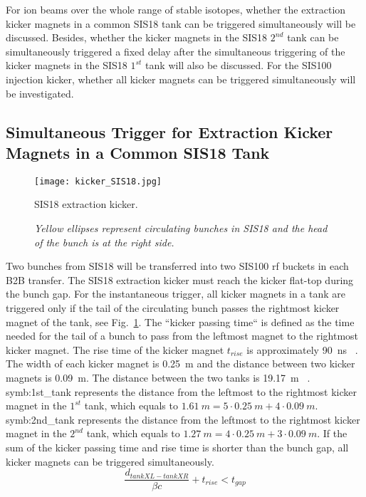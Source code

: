 For ion beams over the whole range of stable isotopes, whether the extraction kicker magnets in a common SIS18 tank can be triggered simultaneously will be discussed. Besides, whether the kicker magnets in the SIS18 $2^{nd}$ tank can be simultaneously triggered a fixed delay after the simultaneous triggering of the kicker magnets in the SIS18 $1^{st}$ tank will also be discussed. For the SIS100 injection kicker, whether all kicker magnets can be triggered simultaneously will be investigated. 


\subsection{Simultaneous Trigger for Extraction Kicker Magnets in a Common SIS18 Tank}
\begin{figure}[H]
   \centering   
   \texttt{[image: kicker\_SIS18.jpg]}
   \caption{SIS18 extraction kicker.}
	\caption*{\textsl{\small{Yellow ellipses represent circulating bunches in SIS18 and the head of the bunch is at the right side.}}}
   \label{kicker_SIS181}
\end{figure}
Two bunches from SIS18 will be transferred into two SIS100 rf buckets in each B2B transfer. The SIS18 extraction kicker must reach the kicker flat-top during the bunch gap. For the instantaneous trigger, all kicker magnets in a tank are triggered only if the tail of the circulating bunch passes the rightmost kicker magnet of the tank, see Fig.~\ref{kicker_SIS181}. The ``kicker passing time`` is defined as the time needed for the tail of a bunch to pass from the leftmost magnet to the rightmost kicker magnet. The rise time of the kicker magnet $t_\mathit{rise}$ is approximately \SI{90}{ns} ~\cite{blell_f-ds-ie-03e_2014}. The width of each kicker magnet is \SI{0.25}{m} and the distance between two kicker magnets is \SI{0.09}{m}. The distance between the two tanks is \SI{19.17}{m} ~\cite{ros_sis18_2008}. \gls{symb:1st_tank} represents the distance from the leftmost to the rightmost kicker magnet in the $1^{st}$ tank, which equals to $\SI{1.61}{m}= 5 \cdot \SI{0.25}{m} + 4 \cdot \SI{0.09}{m}$. \gls{symb:2nd_tank} represents  the distance from the leftmost to the rightmost kicker magnet in the $2^{nd}$ tank, which equals to $\SI{1.27}{m}= 4 \cdot \SI{0.25}{m} + 3 \cdot \SI{0.09}{m}$. If the sum of the kicker passing time and rise time is shorter than the bunch gap, all kicker magnets can be triggered simultaneously. 
\begin{equation}
\label{simul_kicker}
		\frac{d_\mathit{tankXL-tankXR}}{\beta c}+t_\mathit{rise}<t_\mathit{gap}
\end{equation}

